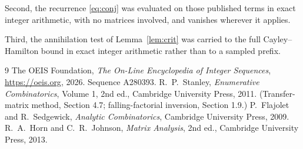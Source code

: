 \documentclass[11pt,a4paper]{article}
\theoremstyle{plain}
\theoremstyle{definition}
\begin{document}
Second, the recurrence \eqref{eq:conj} was evaluated on those published terms in exact
integer arithmetic, with no matrices involved, and vanishes wherever it applies.

Third, the annihilation test of Lemma~\ref{lem:crit} was carried to the full
Cayley--Hamilton bound in exact integer arithmetic rather than to a sampled prefix.

\begin{thebibliography}{9}
 The OEIS Foundation, \emph{The On-Line Encyclopedia of Integer
Sequences}, \url{https://oeis.org}, 2026. Sequence A280393.
 R.~P.~Stanley, \emph{Enumerative Combinatorics}, Volume 1, 2nd ed.,
Cambridge University Press, 2011. (Transfer-matrix method, Section 4.7; falling-factorial
inversion, Section 1.9.)
 P.~Flajolet and R.~Sedgewick, \emph{Analytic Combinatorics}, Cambridge
University Press, 2009.
 R.~A.~Horn and C.~R.~Johnson, \emph{Matrix Analysis}, 2nd ed., Cambridge
University Press, 2013.
\end{thebibliography}
\end{document}
